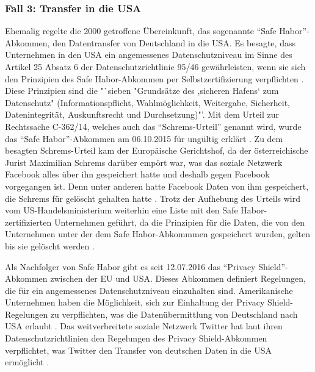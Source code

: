 \subsubsection{Fall 3: Transfer in die USA}
Ehemalig regelte die 2000 getroffene Übereinkunft, das sogenannte "`Safe Habor"'-Abkommen, den Datentransfer von Deutschland in die USA. Es besagte, dass Unternehmen in den USA ein angemessenes Datenschutzniveau im Sinne des Artikel 25 Absatz 6 der Datenschutzrichtlinie 95/46 gewährleisten, wenn sie sich den Prinzipien des Safe Habor-Abkommen per Selbstzertifizierung verpflichten \autocite[vgl.][]{BDFI.2017}. Diese Prinzipien sind die "`sieben "Grundsätze des ,sicheren Hafens‘ zum Datenschutz"  (Informationspflicht, Wahlmöglichkeit, Weitergabe, Sicherheit, Datenintegrität, Auskunftsrecht und Durchsetzung)"'. \autocite[][]{BDFI.2017} Mit dem Urteil zur Rechtssache C-362/14, welches auch das "`Schrems-Urteil"' genannt wird, wurde das "`Safe Habor"'-Abkommen am 06.10.2015 für ungültig erklärt \autocite[vgl.][]{BDFI.2017}. Zu dem besagten Schrems-Urteil kam der Europäische Gerichtshof, da der österreichische Jurist Maximilian Schrems darüber empört war, was das soziale Netzwerk Facebook alles über ihn gespeichert hatte und deshalb gegen Facebook vorgegangen ist. Denn unter anderen hatte Facebook Daten von ihm gespeichert, die Schrems für gelöscht gehalten hatte \autocite[vgl.][]{Welt.2015}. Trotz der Aufhebung des Urteils wird vom US-Handelsministerium weiterhin eine Liste mit den Safe Habor-zertifizierten Unternehmen geführt, da die Prinzipien für die Daten, die von den Unternehmen unter der dem Safe Habor-Abkommmen gespeichert wurden, gelten bis sie gelöscht werden \autocite[vgl.][]{BDFI.2017}.
\par
Als Nachfolger von Safe Habor gibt es seit 12.07.2016 das "`Privacy Shield"'-Abkommen zwischen der \ac{EU} und USA. Dieses Abkommen definiert Regelungen, die für ein angemessenes Datenschutzniveau einzuhalten sind. Amerikanische Unternehmen haben die Möglichkeit, sich zur Einhaltung der Privacy Shield-Regelungen zu verpflichten, was die Datenübermittlung von Deutschland nach USA erlaubt \autocite[vgl.][]{LDI.2017}. Das weitverbreitete soziale Netzwerk Twitter hat laut ihren Datenschutzrichtlinien den Regelungen des Privacy Shield-Abkommen verpflichtet, was Twitter den Transfer von deutschen Daten in die USA ermöglicht \autocite[vgl.][]{TwitterInc..2017}.

